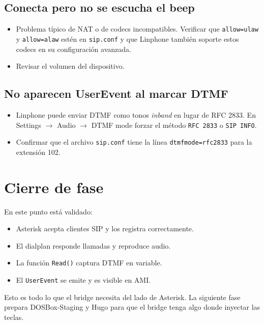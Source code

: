 \subsection{Conecta pero no se escucha el beep}

\begin{itemize}
  \item Problema típico de NAT o de codecs incompatibles. Verificar que \texttt{allow=ulaw} y \texttt{allow=alaw} estén en \texttt{sip.conf} y que Linphone también soporte estos codecs en su configuración avanzada.
  \item Revisar el volumen del dispositivo.
\end{itemize}

\subsection{No aparecen UserEvent al marcar DTMF}

\begin{itemize}
  \item Linphone puede enviar DTMF como tonos \emph{inband} en lugar de RFC 2833. En \textsf{Settings} $\to$ \textsf{Audio} $\to$ \textsf{DTMF mode} forzar el método \texttt{RFC 2833} o \texttt{SIP INFO}.
  \item Confirmar que el archivo \texttt{sip.conf} tiene la línea \texttt{dtmfmode=rfc2833} para la extensión 102.
\end{itemize}

\section{Cierre de fase}

En este punto está validado:

\begin{itemize}
  \item Asterisk acepta clientes SIP y los registra correctamente.
  \item El dialplan responde llamadas y reproduce audio.
  \item La función \texttt{Read()} captura DTMF en variable.
  \item El \texttt{UserEvent} se emite y es visible en AMI.
\end{itemize}

Esto es todo lo que el bridge necesita del lado de Asterisk. La siguiente fase prepara DOSBox-Staging y Hugo para que el bridge tenga algo donde inyectar las teclas.
